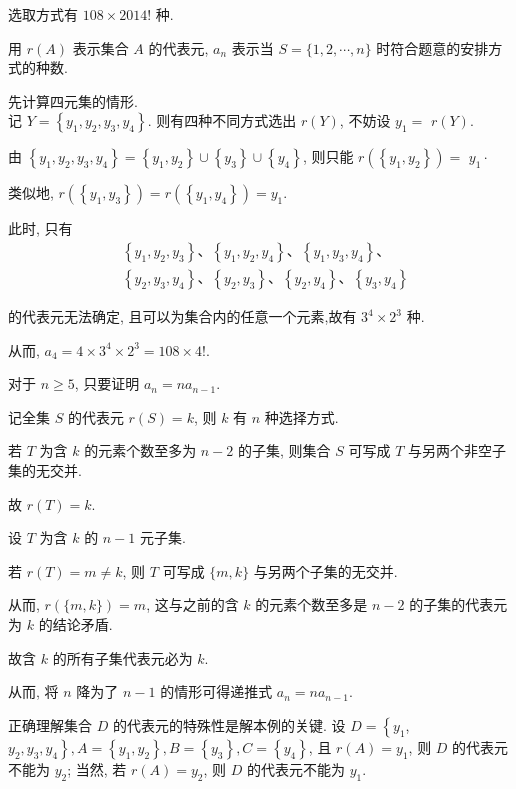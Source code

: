 \begin{solution}
	选取方式有 $108 \times 2014!$ 种.

	用 $r(A)$ 表示集合 $A$ 的代表元, $a_{n}$ 表示当 $S=\{1,2, \cdots, n\}$ 时符合题意的安排方式的种数.

	先计算四元集的情形.\\
	记 $Y=\left\{y_{1}, y_{2}, y_{3}, y_{4}\right\}$. 则有四种不同方式选出 $r(Y)$, 不妨设 $y_{1}=$ $r(Y)$.

	由 $\left\{y_{1}, y_{2}, y_{3}, y_{4}\right\}=\left\{y_{1}, y_{2}\right\} \cup\left\{y_{3}\right\} \cup\left\{y_{4}\right\}$, 则只能 $r\left(\left\{y_{1}, y_{2}\right\}\right)=$ $y_{1} \cdot$

	类似地, $r\left(\left\{y_{1}, y_{3}\right\}\right)=r\left(\left\{y_{1}, y_{4}\right\}\right)=y_{1}$.

	此时, 只有
	$$
		\begin{aligned}
			 & \left\{y_{1}, y_{2}, y_{3}\right\} 、\left\{y_{1}, y_{2}, y_{4}\right\} 、\left\{y_{1}, y_{3}, y_{4}\right\} 、              \\
			 & \left\{y_{2}, y_{3}, y_{4}\right\} 、\left\{y_{2}, y_{3}\right\} 、\left\{y_{2}, y_{4}\right\} 、\left\{y_{3}, y_{4}\right\}
		\end{aligned}
	$$

	的代表元无法确定, 且可以为集合内的任意一个元素,故有 $3^{4} \times 2^{3}$ 种.

	从而, $a_{4}=4 \times 3^{4} \times 2^{3}=108 \times 4!$.

	对于 $n \geqslant 5$, 只要证明 $a_{n}=n a_{n-1}$.

	记全集 $S$ 的代表元 $r(S)=k$, 则 $k$ 有 $n$ 种选择方式.

	若 $T$ 为含 $k$ 的元素个数至多为 $n-2$ 的子集, 则集合 $S$ 可写成 $T$ 与另两个非空子集的无交并.

	故 $r(T)=k$.

	设 $T$ 为含 $k$ 的 $n-1$ 元子集.

	若 $r(T)=m \neq k$, 则 $T$ 可写成 $\{m, k\}$ 与另两个子集的无交并.

	从而, $r(\{m, k\})=m$, 这与之前的含 $k$ 的元素个数至多是 $n-2$ 的子集的代表元为 $k$ 的结论矛盾.

	故含 $k$ 的所有子集代表元必为 $k$.

	从而, 将 $n$ 降为了 $n-1$ 的情形可得递推式 $a_{n}=n a_{n-1}$.
\end{solution}

\begin{note}
	正确理解集合 $D$ 的代表元的特殊性是解本例的关键. 设 $D=\left\{y_{1}\right.$, $\left.y_{2}, y_{3}, y_{4}\right\}, A=\left\{y_{1}, y_{2}\right\}, B=\left\{y_{3}\right\}, C=\left\{y_{4}\right\}$, 且 $r(A)=y_{1}$, 则 $D$ 的代表元不能为 $y_{2}$; 当然, 若 $r(A)=y_{2}$, 则 $D$ 的代表元不能为 $y_{1}$.
\end{note}

